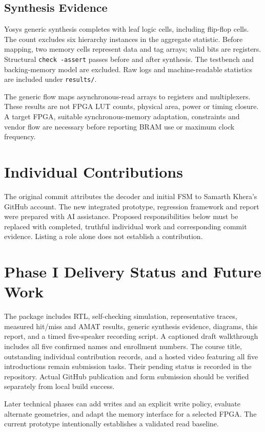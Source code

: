 \documentclass[conference]{IEEEtran}
\begin{document}
\subsection{Synthesis Evidence}
Yosys generic synthesis completes with \GenericCells{} leaf logic cells,
including \GenericFFs{} flip-flop cells. The count excludes six hierarchy
instances in the aggregate statistic. Before mapping, two memory cells
represent data and tag arrays; valid bits are registers. Structural
\texttt{check -assert} passes before and after synthesis. The testbench and
backing-memory model are excluded. Raw logs and machine-readable statistics
are included under \texttt{results/}.

The generic flow maps asynchronous-read arrays to registers and multiplexers.
These results are not FPGA LUT counts, physical area, power or timing closure.
A target FPGA, suitable synchronous-memory adaptation, constraints and vendor
flow are necessary before reporting BRAM use or maximum clock frequency.

\section{Individual Contributions}
The original commit attributes the decoder and initial FSM to Samarth Khera's
GitHub account. The new integrated prototype, regression framework and report
were prepared with AI assistance. Proposed responsibilities below must be
replaced with completed, truthful individual work and corresponding commit
evidence. Listing a role alone does not establish a contribution.



\section{Phase I Delivery Status and Future Work}
The package includes RTL, self-checking simulation, representative traces,
measured hit/miss and AMAT results, generic synthesis evidence, diagrams,
this report, and a timed five-speaker recording script. A captioned draft
walkthrough includes all five confirmed names and enrollment numbers.
The course title, outstanding individual contribution records, and a hosted
video featuring all five introductions remain submission tasks. Their pending status is recorded in
the repository. Actual GitHub publication and form submission should be
verified separately from local build success.

Later technical phases can add writes and an explicit write policy, evaluate
alternate geometries, and adapt the memory interface for a selected FPGA.
The current prototype intentionally establishes a validated read baseline.
\end{document}
